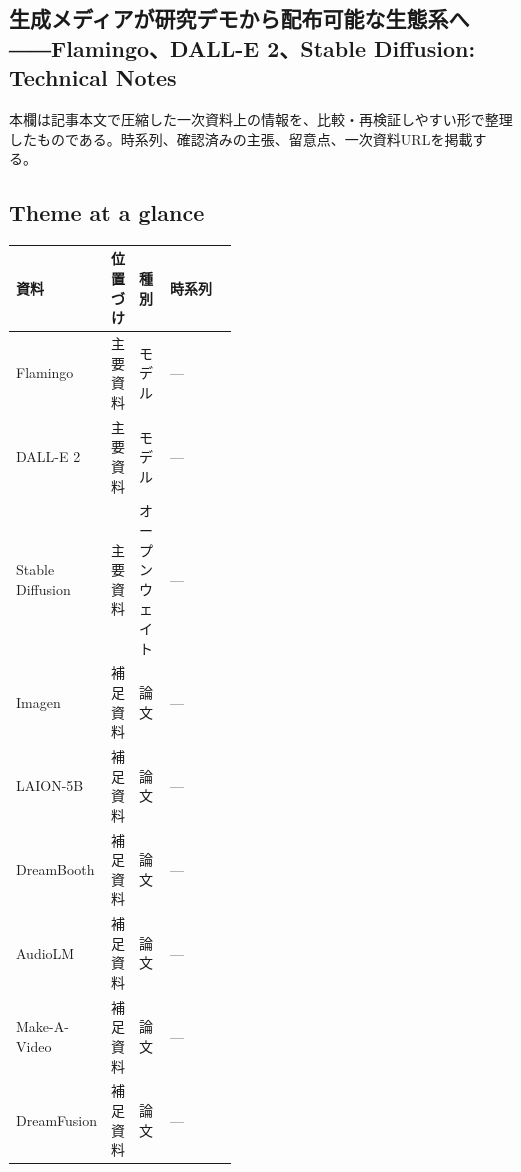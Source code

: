\subsection*{生成メディアが研究デモから配布可能な生態系へ――Flamingo、DALL-E 2、Stable Diffusion: Technical Notes}
本欄は記事本文で圧縮した一次資料上の情報を、比較・再検証しやすい形で整理したものである。時系列、確認済みの主張、留意点、一次資料URLを掲載する。
\smallskip
{}\par
\medskip
\subsection*{Theme at a glance}
\begin{center}
\footnotesize
\begin{tabularx}{\linewidth}{@{}p{0.20\linewidth}p{0.10\linewidth}p{0.14\linewidth}X@{}}
\toprule
資料 & 位置づけ & 種別 & 時系列 \\
\midrule
Flamingo & 主要資料 & モデル & — \\
DALL-E 2 & 主要資料 & モデル & — \\
Stable Diffusion & 主要資料 & オープンウェイト & — \\
Imagen & 補足資料 & 論文 & — \\
LAION-5B & 補足資料 & 論文 & — \\
DreamBooth & 補足資料 & 論文 & — \\
AudioLM & 補足資料 & 論文 & — \\
Make-A-Video & 補足資料 & 論文 & — \\
DreamFusion & 補足資料 & 論文 & — \\
\bottomrule
\end{tabularx}
\end{center}
\normalsize

